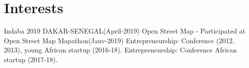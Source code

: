 \documentclass[11pt,a4paper]{moderncv}
\begin{document}



\section{Interests}
 {Indaba 2019 DAKAR-SENEGAL(April-2019)}
 {Open Street Map - Participated at Open Street Map Mapathon(Janv-2019)}
 {Entrepreneurship: Conference (2012, 2013), young African startup (2016-18).}
 {Entrepreneurship: Conference  African startup (2017-18).}
\end{document}
